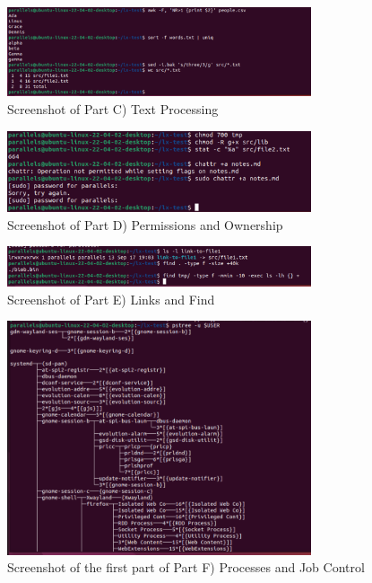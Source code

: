 \begin{figure}[h!]
    \centering
    \includegraphics[width=0.8\textwidth]{linuxptC.png}
    \caption{Screenshot of Part C) Text Processing}
    \label{fig:problemsetC}
\end{figure}

\begin{figure}[h!]
    \centering
    \includegraphics[width=0.8\textwidth]{linuxptD.png}
    \caption{Screenshot of Part D) Permissions and Ownership}
    \label{fig:problemsetD}
    
\end{figure}

\begin{figure}[h!]
    \centering
    \includegraphics[width=0.8\textwidth]{linuxptE.png}
    \caption{Screenshot of Part E) Links and Find}
    \label{fig:problemsetE}
    
\end{figure}

\begin{figure}[h!]
    \centering
    \includegraphics[width=0.8\textwidth]{linuxptF.png}
    \caption{Screenshot of the first part of Part F) Processes and Job Control}
    \label{fig:problemsetF}
    
\end{figure}

